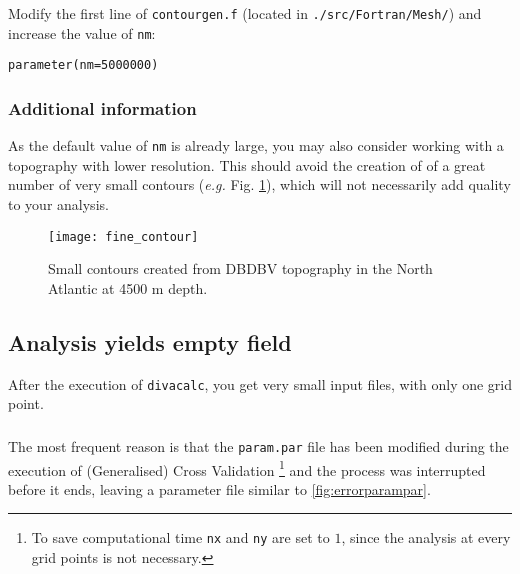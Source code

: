 Modify the first line of \texttt{contourgen.f} (located in \texttt{./src/Fortran/Mesh/}) and increase the value of \texttt{nm}:
\begin{verbatim}
parameter(nm=5000000)
\end{verbatim}

\subsubsection{Additional information}

As the default value of \texttt{nm} is already large, you may also consider working with a topography with lower resolution. This should avoid the creation of of a great number of very small contours (\textit{e.g.} Fig. \ref{fig:smallcont}), which will not necessarily add quality to your analysis.


\begin{figure}[htpb]
\centering
\parbox{.65\textwidth}{
\texttt{[image: fine\_contour]}
}\parbox{.35\textwidth}{
\caption[Small contours]{Small contours created from DBDBV topography in the North Atlantic at 4500 m depth\label{fig:smallcont}.}
}
\end{figure}
 


%





\subsection{Analysis yields empty field}


After the execution of \texttt{divacalc}, you get very small input files, with only one grid point.

\subsubsection{\question}

The most frequent reason is that the \texttt{param.par} file has been modified during the execution of (Generalised) Cross Validation \footnote{To save computational time \texttt{nx} and \texttt{ny} are set to $1$, since the analysis at every grid points is not necessary.} and the process was interrupted before it ends, leaving a parameter file similar to \ref{fig:errorparampar}.


